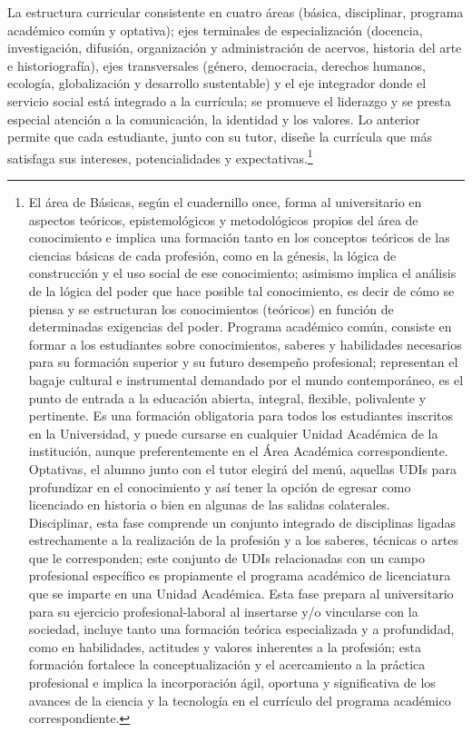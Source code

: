La estructura curricular consistente en cuatro áreas (básica, 
disciplinar, programa académico común y optativa); ejes terminales de 
especialización (docencia, investigación, difusión, organización y 
administración de acervos, historia del arte e historiografía), ejes 
transversales (género, democracia, derechos humanos, ecología, 
globalización y desarrollo sustentable) y el eje integrador donde el 
servicio social está integrado a la currícula; se promueve el liderazgo 
y se presta especial atención a la comunicación, la identidad y los 
valores. Lo anterior permite que cada estudiante, junto con su tutor, 
diseñe la currícula que más satisfaga sus intereses, potencialidades y 
expectativas.\footnote{El área de Básicas, según el cuadernillo once, 
forma al universitario en aspectos teóricos, epistemológicos y 
metodológicos propios del área de conocimiento e implica una formación 
tanto en los conceptos teóricos de las ciencias básicas de cada 
profesión, como en la génesis, la lógica de construcción y el uso 
social de ese conocimiento; asimismo implica el análisis de la lógica 
del poder que hace posible tal conocimiento, es decir de cómo se piensa 
y se estructuran los conocimientos (teóricos) en función de 
determinadas exigencias del poder.  Programa académico común, consiste 
en formar a los estudiantes sobre conocimientos, saberes y habilidades 
necesarios para su formación superior y su futuro desempeño 
profesional; representan el bagaje cultural e instrumental demandado 
por el mundo contemporáneo, es el punto de entrada a la educación 
abierta, integral, flexible, polivalente y pertinente. Es una formación 
obligatoria para todos los estudiantes inscritos en la Universidad, y 
puede cursarse en cualquier Unidad Académica de la institución, aunque 
preferentemente en el Área Académica correspondiente. Optativas, 
el alumno junto con el tutor elegirá del menú, aquellas UDIs para 
profundizar en el conocimiento y así tener la opción de egresar como 
licenciado en historia o bien en algunas de las salidas colaterales.\\   
Disciplinar, esta fase comprende un conjunto integrado de disciplinas 
ligadas estrechamente a la realización de la profesión y a los saberes, 
técnicas o artes que le corresponden; este conjunto de UDIs 
relacionadas con un campo profesional específico es propiamente el 
programa académico de licenciatura que se imparte en una Unidad 
Académica. Esta fase prepara al universitario para su ejercicio 
profesional-laboral al insertarse y/o vincularse con la sociedad, 
incluye tanto una formación teórica especializada y a profundidad, como 
en habilidades, actitudes y valores inherentes a la profesión; esta 
formación fortalece la conceptualización y el acercamiento a la 
práctica profesional e implica la incorporación ágil, oportuna y 
significativa de los avances de la ciencia y la tecnología en el 
currículo del programa académico correspondiente.}  

